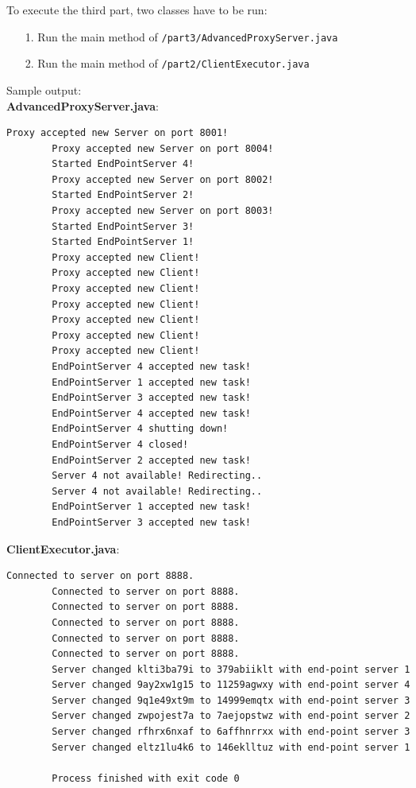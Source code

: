 \documentclass{article}
\begin{document}
      To execute the third part, two classes have to be run:
      \begin{itemize}
      	\item[1.] Run the main method of \texttt{/part3/AdvancedProxyServer.java}
      	\item[2.] Run the main method of \texttt{/part2/ClientExecutor.java}
      \end{itemize}
      Sample output:\\
      \textbf{AdvancedProxyServer.java}:\\
      \begin{lstlisting}[language=sh]
        Proxy accepted new Server on port 8001!
        Proxy accepted new Server on port 8004!
        Started EndPointServer 4!
        Proxy accepted new Server on port 8002!
        Started EndPointServer 2!
        Proxy accepted new Server on port 8003!
        Started EndPointServer 3!
        Started EndPointServer 1!
        Proxy accepted new Client!
        Proxy accepted new Client!
        Proxy accepted new Client!
        Proxy accepted new Client!
        Proxy accepted new Client!
        Proxy accepted new Client!
        Proxy accepted new Client!
        EndPointServer 4 accepted new task!
        EndPointServer 1 accepted new task!
        EndPointServer 3 accepted new task!
        EndPointServer 4 accepted new task!
        EndPointServer 4 shutting down!
        EndPointServer 4 closed!
        EndPointServer 2 accepted new task!
        Server 4 not available! Redirecting..
        Server 4 not available! Redirecting..
        EndPointServer 1 accepted new task!
        EndPointServer 3 accepted new task!
      \end{lstlisting}
      \textbf{ClientExecutor.java}:\\
      \begin{lstlisting}[language=sh]
        Connected to server on port 8888.
        Connected to server on port 8888.
        Connected to server on port 8888.
        Connected to server on port 8888.
        Connected to server on port 8888.
        Connected to server on port 8888.
        Server changed klti3ba79i to 379abiiklt with end-point server 1
        Server changed 9ay2xw1g15 to 11259agwxy with end-point server 4
        Server changed 9q1e49xt9m to 14999emqtx with end-point server 3
        Server changed zwpojest7a to 7aejopstwz with end-point server 2
        Server changed rfhrx6nxaf to 6affhnrrxx with end-point server 3
        Server changed eltz1lu4k6 to 146eklltuz with end-point server 1
        
        Process finished with exit code 0
      \end{lstlisting}
	
\end{document}
